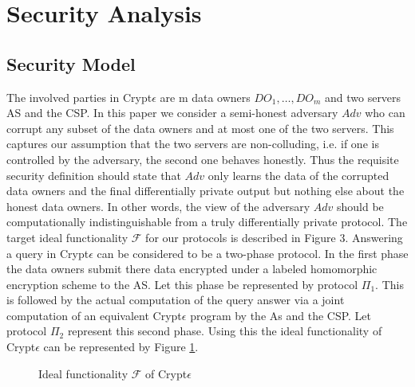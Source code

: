 \section{Security Analysis}
\subsection{Security Model}
The involved parties in Crypt$\epsilon$ are m data owners $DO_1,\ldots, DO_m$ and two servers AS and the CSP. In this paper we consider a
semi-honest adversary  $Adv$ who can corrupt any subset of the data owners and at most one of the two
servers. This captures our assumption that the two servers are non-colluding, i.e. if one is controlled
by the adversary, the second one behaves honestly. Thus the requisite security definition should state that $Adv$ only learns the data of the corrupted data owners and the final differentially private output but nothing else about the honest data owners. In other words, the view of the adversary $Adv$ should be computationally indistinguishable from a truly differentially private protocol.
The target ideal functionality $\mathcal{F}$ for our protocols is described in Figure 3. Answering a query in Crypt$\epsilon$ can be considered to be a two-phase protocol. In the first phase the data owners submit there data encrypted under a labeled homomorphic encryption scheme to the AS. Let this phase be represented by protocol $\Pi_1$. This is followed by the actual computation of the query answer via a joint computation of an equivalent Crypt$\epsilon$ program by the As and the CSP.  Let protocol $\Pi_2$ represent this second phase. Using this the ideal functionality of Crypt$\epsilon$ can be represented by Figure \ref{ideal}. 
 \begin{figure}\noindent
{} \label{ideal} \caption{Ideal functionality $\mathcal{F}$ of Crypt$\epsilon$} \end{figure}
